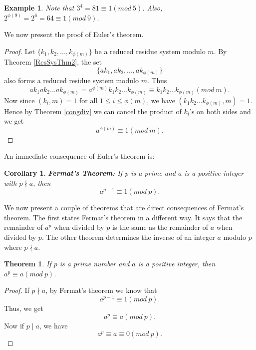\documentclass[12pt,letterpaper]{book}
\newtheorem{theorem}{Theorem}
\newtheorem{cor}{Corollary}
\newtheorem{example}{Example}
\begin{document}
\begin{example}
Note that $3^4=81 \equiv 1(mod \ 5)$. Also,
$2^{\phi(9)}=2^6=64\equiv 1(mod \ 9)$.
\end{example}

We now present the proof of Euler's theorem.

\begin{proof}
Let $\{k_1,k_2,...,k_{\phi(m)}\}$ be a reduced residue system modulo
$m$. By Theorem \ref{ResSysThm2}, the set
\begin{equation*}
\{ak_1,ak_2,...,ak_{\phi(m)}\}
\end{equation*}
also forms a reduced residue system modulo $m$. Thus
\begin{equation*}
ak_1ak_2...ak_{\phi(m)}=a^{\phi(m)}k_1k_2...k_{\phi(m)}\equiv
k_1k_2...k_{\phi(m)}(mod \ m).
\end{equation*}
Now since $(k_i,m)=1$ for all $1\leq i\leq \phi(m)$, we have
$(k_1k_2...k_{\phi(m)},m)=1$.  Hence by Theorem \ref{congdiv} we can cancel the
product of $k_i$'s on both sides and we get
\begin{equation*}
a^{\phi(m)}\equiv 1(mod \ m).
\end{equation*}
\end{proof}

An immediate consequence of Euler's theorem is: 
\begin{cor}\textbf{Fermat's Theorem:}
If p is a prime and $a$ is a positive integer with $p\nmid a$, then
\begin{equation*}
a^{p-1}\equiv 1(mod\ p).
\end{equation*}
\end{cor}


We now present a couple of theorems that are direct consequences of
Fermat's theorem.  The first states Fermat's theorem in a different
way.  It says that the remainder of $a^{p}$ when divided by $p$ is
the same as the remainder of $a$ when divided by $p$. The other
theorem determines the inverse of an integer $a$ modulo $p$ where
$p\nmid a$.

\begin{theorem}
If $p$ is a prime number and $a$ is a positive integer, then\\
$a^p\equiv a(mod \ p)$.
\end{theorem}

\begin{proof}
If $p\nmid a$, by Fermat's theorem we know that
\begin{equation*}
a^{p-1}\equiv 1(mod \ p).
\end{equation*}
Thus, we get
\begin{equation*}
a^{p}\equiv a(mod \ p).
\end{equation*}
Now if $p\mid a$, we have
\begin{equation*}
a^p\equiv a\equiv 0 (mod \ p).
\end{equation*}
\end{proof}
\end{document}
